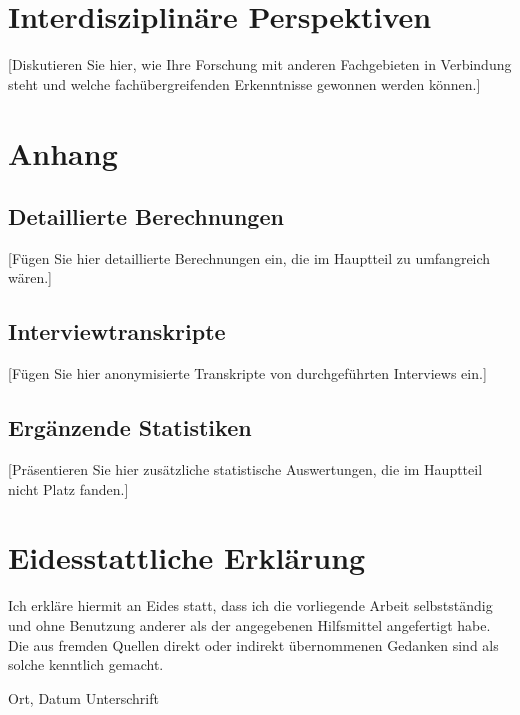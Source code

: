 \documentclass[a4paper,12pt]{article}
\begin{document}
\section{Interdisziplinäre Perspektiven}
[Diskutieren Sie hier, wie Ihre Forschung mit anderen Fachgebieten in Verbindung steht und welche fachübergreifenden Erkenntnisse gewonnen werden können.]




\appendix
\section{Anhang}
\subsection{Detaillierte Berechnungen}
[Fügen Sie hier detaillierte Berechnungen ein, die im Hauptteil zu umfangreich wären.]

\subsection{Interviewtranskripte}
[Fügen Sie hier anonymisierte Transkripte von durchgeführten Interviews ein.]

\subsection{Ergänzende Statistiken}
[Präsentieren Sie hier zusätzliche statistische Auswertungen, die im Hauptteil nicht Platz fanden.]

\section*{Eidesstattliche Erklärung}
Ich erkläre hiermit an Eides statt, dass ich die vorliegende Arbeit selbstständig und ohne Benutzung anderer als der angegebenen Hilfsmittel angefertigt habe. Die aus fremden Quellen direkt oder indirekt übernommenen Gedanken sind als solche kenntlich gemacht.

\vspace{2cm}
\noindent
Ort, Datum \hfill Unterschrift
\end{document}
